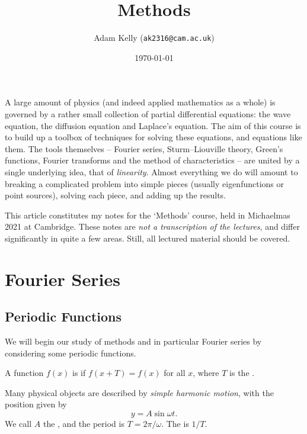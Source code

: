 \documentclass[a4paper]{scrartcl}
\title{Methods}
\author{Adam Kelly (\texttt{ak2316@cam.ac.uk})}
\date{\today}
\begin{document}
\maketitle

A large amount of physics (and indeed applied mathematics as a whole) is governed by a rather small collection of partial differential equations: the wave equation, the diffusion equation and Laplace's equation. The aim of this course is to build up a toolbox of techniques for solving these equations, and equations like them.
The tools themselves -- Fourier series, Sturm--Liouville theory, Green's functions, Fourier transforms and the method of characteristics -- are united by a single underlying idea, that of \emph{linearity}. Almost everything we do will amount to breaking a complicated problem into simple pieces (usually eigenfunctions or point sources), solving each piece, and adding up the results.

This article constitutes my notes for the `Methods' course, held in Michaelmas 2021 at Cambridge. These notes are \emph{not a transcription of the lectures}, and differ significantly in quite a few areas. Still, all lectured material should be covered.

\tableofcontents

\section{Fourier Series}

\subsection{Periodic Functions}

We will begin our study of methods and in particular Fourier series by considering some periodic functions.

\begin{definition}[Periodic]
    A function $f(x)$ is  if $f(x + T) = f(x)$ for all $x$, where $T$ is the .
\end{definition}

\begin{example}
    Many physical objects are described by \emph{simple harmonic motion}, with the position given by
    $$
    y = A \sin \omega t.
    $$
    We call $A$ the , and the period is $T = 2 \pi / \omega$. The  is $1/T$.
\end{example}
\end{document}
